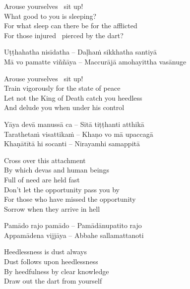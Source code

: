 \begin{english}
  Arouse yourselves \breathmark\ sit up!\\
  What good to you is sleeping?\\
  For what sleep can there be for the afflicted\\
  For those injured \breathmark\ pierced by the dart?
\end{english}

\begin{twochants}
  Uṭṭhahatha nisīdatha – Daḷhaṁ sikkhatha santiyā\\
  Mā vo pamatte viññāya – Maccurājā amohayittha vasānuge\\
\end{twochants}

\begin{english}
  Arouse yourselves \breathmark\ sit up!\\
  Train vigorously for the state of peace\\
  Let not the King of Death catch you heedless\\
  And delude you when under his control
\end{english}

\begin{twochants}
  Yāya devā manussā ca – Sitā tiṭṭhanti atthikā\\
  Tarathetaṁ visattikaṁ – Khaṇo vo mā upaccagā\\
  Khaṇātītā hi socanti – Nirayamhi samappitā\\
\end{twochants}

\begin{english}
  Cross over this attachment\\
  By which devas and human beings\\
  Full of need are held fast\\
  Don’t let the opportunity pass you by\\
  For those who have missed the opportunity\\
  Sorrow when they arrive in hell
\end{english}

\begin{twochants}
  Pamādo rajo pamādo – Pamādānupatito rajo\\
  Appamādena vijjāya – Abbahe sallamattanoti\\
\end{twochants}

\begin{english}
  Heedlessness is dust always\\
  Dust follows upon heedlessness\\
  By heedfulness by clear knowledge\\
  Draw out the dart from yourself
\end{english}


